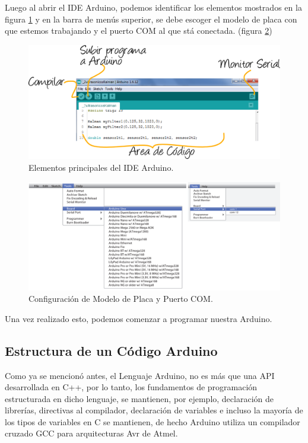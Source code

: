 \documentclass[letterpaper, 10pt]{report}
\begin{document}
Luego al abrir el IDE Arduino, podemos identificar los elementos mostrados en la figura \ref{ideArduino} y en la barra de menús superior, se debe escoger el modelo de placa con que estemos trabajando y el puerto COM al que stá conectada. (figura \ref{puertoplaca})
\begin{figure}
\centering
\includegraphics[scale=0.5]{ideArduino.png}
\caption{Elementos principales del IDE Arduino. \label{ideArduino}}
\end{figure}

\begin{figure}
\centering
\includegraphics[scale=0.4]{puertoplaca.png}
\caption{Configuración de Modelo de Placa y Puerto COM. \label{puertoplaca}}
\end{figure}

Una vez realizado esto, podemos comenzar a programar nuestra Arduino.

\subsection{Estructura de un Código Arduino}

Como ya se mencionó antes, el Lenguaje Arduino, no es más que una API desarrollada en C++, por lo tanto, los fundamentos de programación estructurada en dicho lenguaje, se mantienen, por ejemplo, declaración de librerías, directivas al compilador, declaración de variables e incluso la mayoría de los tipos de variables en C se mantienen, de hecho Arduino utiliza un compilador cruzado GCC para arquitecturas Avr de Atmel.
\end{document}

